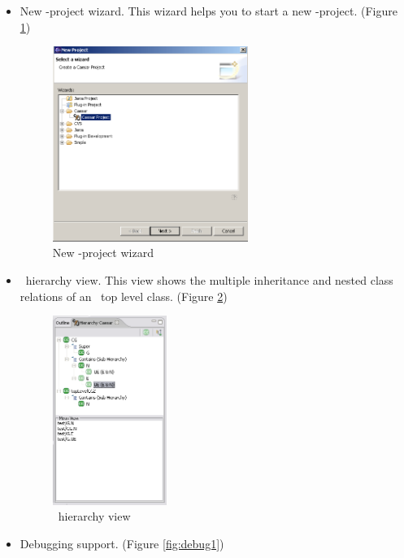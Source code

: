 \begin{itemize}
  \item New \caesarj -project wizard. This wizard helps you to start a new \caesarj -project. (Figure \ref{fig:projectwizard})
  
\begin{figure}[htbp]
	\centering
		\includegraphics[width=0.60\textwidth]{images/project_wizard.png}
	\caption{New \caesarj -project wizard}
	\label{fig:projectwizard}
\end{figure} 
     
  \item \caesarj ~hierarchy view. This view shows the multiple inheritance and nested class relations of an \caesarj ~top level class. (Figure \ref{fig:hierarchy})
  
\begin{figure}[htbp]
	\centering
		\includegraphics[width=0.35\textwidth]{images/hierarchy.png}
	\caption{\caesarj ~hierarchy view}
	\label{fig:hierarchy}
\end{figure} 

  \item Debugging support. (Figure \ref{fig:debug1})
  

\end{itemize}
